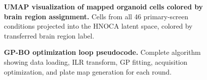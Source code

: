 \documentclass[times,twoside]{zHenriquesLab-StyleBioRxiv}
\begin{document}
\begin{figure}[H]
\centering
{}
\caption{\textbf{UMAP visualization of mapped organoid cells colored by brain region assignment.} Cells from all 46 primary-screen conditions projected into the HNOCA latent space, colored by transferred brain region label.}
\label{fig:supp-umap}
\end{figure}

\begin{figure}[H]
\centering
{}
\caption{\textbf{GP-BO optimization loop pseudocode.} Complete algorithm showing data loading, ILR transform, GP fitting, acquisition optimization, and plate map generation for each round.}
\label{fig:supp-algo}
\end{figure}
\end{document}
